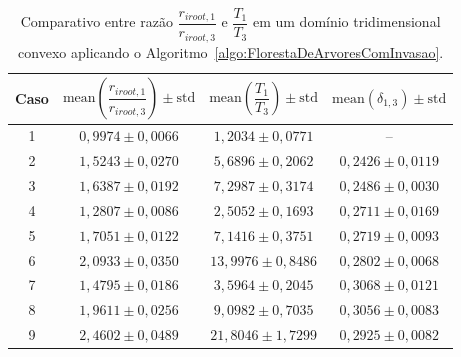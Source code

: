 \begin{table}[!htb]
  \centering
  \captiondelim{: }
  \caption{Comparativo entre razão $\dfrac{r_{iroot, 1}}{r_{iroot, 3}}$ e $\dfrac{T_1}{T_3}$ 
  em um domínio tridimensional convexo aplicando o Algoritmo~\ref{algo:FlorestaDeArvoresComInvasao}.}
\begin{tabular}{|c|c|c|c|}
\hline
Caso & $\textrm{mean}\left(\dfrac{r_{iroot, 1}}{r_{iroot, 3}}\right)\pm \textrm{std}$ & $\textrm{mean}\left(\dfrac{T_1}{T_3}\right) \pm \textrm{std}$ & $\textrm{mean}\left(\delta_{1,3}\right) \pm \textrm{std}$ \\ \hline
1 & $0,9974 \pm 0,0066$ & $1,2034 \pm 0,0771$ & -- \\ \hline
2 & $1,5243 \pm 0,0270$ & $5,6896 \pm 0,2062$ & $0,2426 \pm 0,0119$ \\ \hline
3 & $1,6387 \pm 0,0192$ & $7,2987 \pm 0,3174$ & $0,2486 \pm 0,0030$ \\ \hline
4 & $1,2807 \pm 0,0086$ & $2,5052 \pm 0,1693$ & $0,2711 \pm 0,0169$ \\ \hline
5 & $1,7051 \pm 0,0122$ & $7,1416 \pm 0,3751$ & $0,2719 \pm 0,0093$ \\ \hline
6 & $2,0933 \pm 0,0350$ & $13,9976 \pm 0,8486$ & $0,2802 \pm 0,0068$ \\ \hline
7 & $1,4795 \pm 0,0186$ & $3,5964 \pm 0,2045$ & $0,3068 \pm 0,0121$ \\ \hline
8 & $1,9611 \pm 0,0256$ & $9,0982 \pm 0,7035$ & $0,3056 \pm 0,0083$ \\ \hline
9 & $2,4602 \pm 0,0489$ & $21,8046 \pm 1,7299$ & $0,2925 \pm 0,0082$ \\ \hline
\end{tabular}
  \label{tab:resultados-lei-alometrica-floresta-com-coeficiente-de-invasao-3arvores-3d-parte2}
\end{table}

